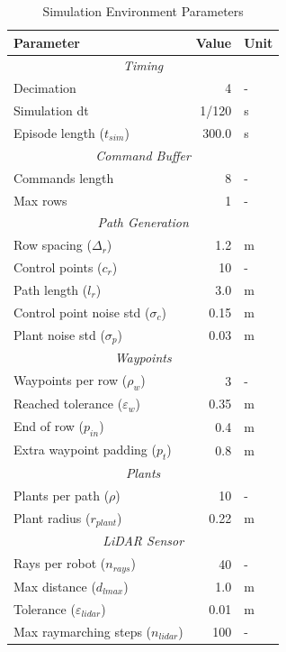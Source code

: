 \documentclass[11pt,a4paper,twocolumn]{article}
\begin{document}
\begin{table}[h]
\centering
\caption{Simulation Environment Parameters}
\label{tab:sim_params}
\small
\begin{tabular}{|l|r|l|}
\hline
\textbf{Parameter} & \textbf{Value} & \textbf{Unit} \\
\hline
\multicolumn{3}{|c|}{\textit{Timing}} \\
\hline
Decimation & 4 & - \\
Simulation dt & 1/120 & s \\
Episode length ($t_{sim}$) & 300.0 & s \\
\hline
\multicolumn{3}{|c|}{\textit{Command Buffer}} \\
\hline
Commands length & 8 & - \\
Max rows & 1 & - \\
\hline
\multicolumn{3}{|c|}{\textit{Path Generation}} \\
\hline
Row spacing ($\Delta_r$) & 1.2 & m \\
Control points ($c_r$) & 10 & - \\
Path length ($l_r$) & 3.0 & m \\
Control point noise std ($\sigma_c$) & 0.15 & m \\
Plant noise std ($\sigma_p$) & 0.03 & m \\
\hline
\multicolumn{3}{|c|}{\textit{Waypoints}} \\
\hline
Waypoints per row ($\rho_w$) & 3 & - \\
Reached tolerance ($\varepsilon_w$) & 0.35 & m \\
End of row  ($p_{in}$) & 0.4 & m \\
Extra waypoint padding ($p_t$) & 0.8 & m \\
\hline
\multicolumn{3}{|c|}{\textit{Plants}} \\
\hline
Plants per path ($\rho$) & 10 & - \\
Plant radius ($r_{plant}$) & 0.22 & m \\
\hline
\multicolumn{3}{|c|}{\textit{LiDAR Sensor}} \\
\hline
Rays per robot ($n_{rays}$) & 40 & - \\
Max distance ($d_{lmax}$) & 1.0 & m \\
Tolerance ($\varepsilon_{lidar}$) & 0.01 & m \\
Max raymarching steps ($n_{lidar}$) & 100 & - \\
\hline
\end{tabular}
\end{table}
\end{document}
